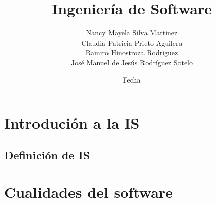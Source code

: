 \documentclass{book}
\title{Ingenier\'ia de Software}
\author{ Nancy Mayela Silva Martinez \\ Claudia Patricia Prieto Aguilera \\ Ramiro Hinostroza Rodriguez\\  José Manuel de Jesús Rodríguez Sotelo \\}
\date{Fecha}
\begin{document}
\maketitle

\chapter{Introduci\'on a la IS}

\section{ Definici\'on de IS}

%


\chapter{Cualidades del software}


%

\end{document}
